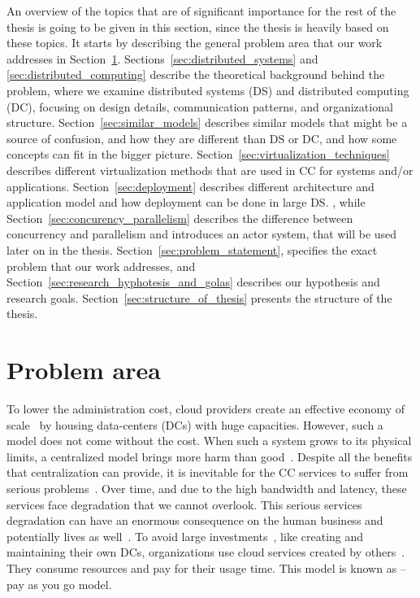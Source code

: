An overview of the topics that are of significant importance for the rest of the thesis is going to be given in this section, since the thesis is heavily based on these topics. It starts by describing the general problem area that our work addresses in Section~\ref{sec:problem_area}. Sections~\ref{sec:distributed_systems} and \ref{sec:distributed_computing} describe the theoretical background behind the problem, where we examine distributed systems (DS) and distributed computing (DC), focusing on design details, communication patterns, and organizational structure. Section~\ref{sec:similar_models} describes similar models that might be a source of confusion, and how they are different than DS or DC, and how some concepts can fit in the bigger picture. Section~\ref{sec:virtualization_techniques} describes different virtualization methods that are used in CC for systems and/or applications. Section~\ref{sec:deployment} describes different architecture and application model and how deployment can be done in large DS. , while Section~\ref{sec:concurency_parallelism} describes the difference between concurrency and parallelism and introduces an actor system, that will be used later on in the thesis. Section~\ref{sec:problem_statement}, specifies the exact problem that our work addresses, and Section~\ref{sec:research_hyphotesis_and_golas} describes our hypothesis and research goals. Section~\ref{sec:structure_of_thesis} presents the structure of the thesis.
%
%
%
\section{Problem area}\label{sec:problem_area}
%
To lower the administration cost, cloud providers create an effective economy of scale~\cite{BariBEGPRZZ13} by housing data-centers (DCs) with huge capacities. However, such a model does not come without the cost. When such a  system grows to its physical limits, a centralized model brings more harm than good~\cite{GunawiHSLSAE16, LopezMEDHIBFR15}. Despite all the benefits that centralization can provide, it is inevitable for the CC services to suffer from serious problems~\cite{KarimIWGSYO16}. Over time, and due to the high bandwidth and latency, these services face degradation that we cannot overlook. This serious services degradation can have an enormous consequence on the human business and potentially lives as well~\cite{El-SayedSPPGML18}. To avoid large investments~\cite{MonsalveCC18}, like creating and maintaining their own DCs, organizations use cloud services created by others~\cite{Satyanarayanan17}. They consume resources and pay for their usage time. This model is known as -- pay as you go model.

